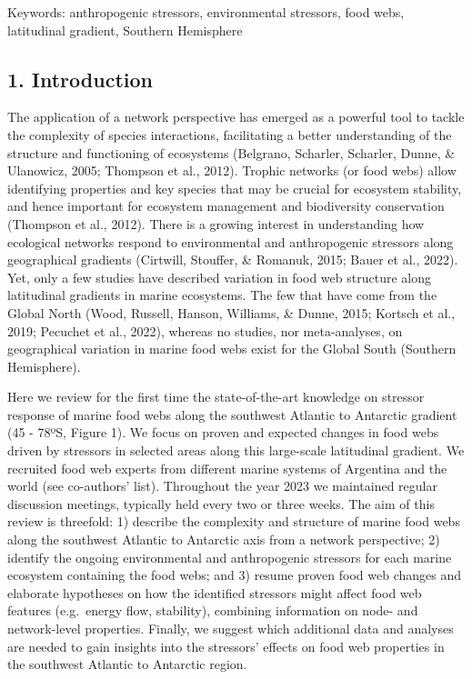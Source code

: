 \documentclass[
]{article}
\begin{document}
Keywords: anthropogenic stressors, environmental stressors, food webs,
latitudinal gradient, Southern Hemisphere

\hypertarget{introduction}{%
\subsection{1. Introduction}\label{introduction}}

The application of a network perspective has emerged as a powerful tool
to tackle the complexity of species interactions, facilitating a better
understanding of the structure and functioning of ecosystems (Belgrano,
Scharler, Scharler, Dunne, \& Ulanowicz, 2005; Thompson et al., 2012).
Trophic networks (or food webs) allow identifying properties and key
species that may be crucial for ecosystem stability, and hence important
for ecosystem management and biodiversity conservation (Thompson et al.,
2012). There is a growing interest in understanding how ecological
networks respond to environmental and anthropogenic stressors along
geographical gradients (Cirtwill, Stouffer, \& Romanuk, 2015; Bauer et
al., 2022). Yet, only a few studies have described variation in food web
structure along latitudinal gradients in marine ecosystems. The few that
have come from the Global North (Wood, Russell, Hanson, Williams, \&
Dunne, 2015; Kortsch et al., 2019; Pecuchet et al., 2022), whereas no
studies, nor meta-analyses, on geographical variation in marine food
webs exist for the Global South (Southern Hemisphere).

Here we review for the first time the state-of-the-art knowledge on
stressor response of marine food webs along the southwest Atlantic to
Antarctic gradient (45 - 78ºS, Figure 1). We focus on proven and
expected changes in food webs driven by stressors in selected areas
along this large-scale latitudinal gradient. We recruited food web
experts from different marine systems of Argentina and the world (see
co-authors' list). Throughout the year 2023 we maintained regular
discussion meetings, typically held every two or three weeks. The aim of
this review is threefold: 1) describe the complexity and structure of
marine food webs along the southwest Atlantic to Antarctic axis from a
network perspective; 2) identify the ongoing environmental and
anthropogenic stressors for each marine ecosystem containing the food
webs; and 3) resume proven food web changes and elaborate hypotheses on
how the identified stressors might affect food web features (e.g.~energy
flow, stability), combining information on node- and network-level
properties. Finally, we suggest which additional data and analyses are
needed to gain insights into the stressors' effects on food web
properties in the southwest Atlantic to Antarctic region.
\end{document}
